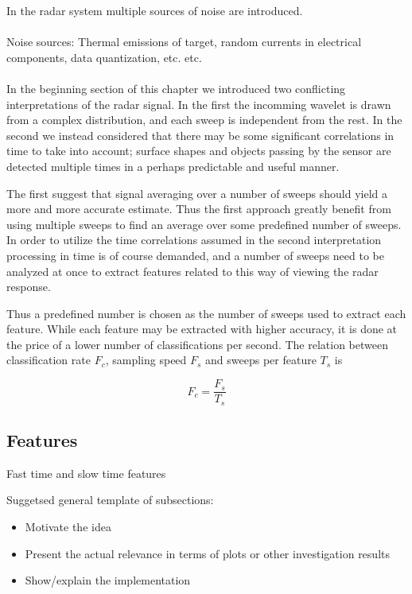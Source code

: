 \documentclass[a4paper, 12pt]{article}
\begin{document}
In the radar system multiple sources of noise are introduced.
\\ \\
Noise sources: Thermal emissions of target, random currents in electrical components, data quantization, etc. etc. \citep{w_doerry_2016}
\\ \\
In the beginning section of this chapter we introduced two conflicting interpretations of the radar signal. In the first the incomming wavelet is drawn from a complex distribution, and each sweep is independent from the rest. In the second we instead considered that there may be some significant correlations in time to take into account; surface shapes and objects passing by the sensor are detected multiple times in a perhaps predictable and useful manner.  

The first suggest that signal averaging over a number of sweeps should yield a more and more accurate estimate. Thus the first approach greatly benefit from using multiple sweeps to find an average over some predefined number of sweeps.  In order to utilize the time correlations assumed in the second interpretation processing in time is of course demanded, and a number of sweeps need to be analyzed at once to extract features related to this way of viewing the radar response. 

Thus a predefined number is chosen as the number of sweeps used to extract each feature. While each feature may be extracted with higher accuracy, it is done at the price of a lower number of classifications per second. The relation between classification rate $F_c$, sampling speed $F_s$ and sweeps per feature $T_s$ is



\begin{equation}
	F_c = \frac{F_s}{T_s}
\end{equation}

\subsection{Features}

Fast time and slow time features 

Suggetsed general template of subsections: 
\begin{itemize}
	\item{Motivate the idea}
	\item{Present the actual relevance in terms of plots or other investigation results}
	\item{Show/explain the implementation}
\end{itemize}
\end{document}
